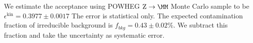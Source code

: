 

We estimate the acceptance using POWHEG $\Zmm$ Monte Carlo sample to be
$\epsilon^{\mathrm{kin}} = 0.3977 \pm 0.0017$
The error is statistical only.
The expected contamination fraction of irreducible background
is $f_{bkg}=0.43 \pm 0.02\%$. We subtract this fraction and take the
uncertainty as systematic error.


